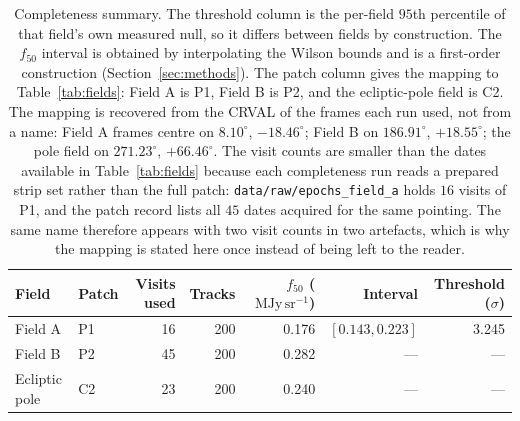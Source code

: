 \documentclass[11pt,a4paper]{article}
\newcommand{\mjysr}{\ \mathrm{MJy\,sr^{-1}}}
\newcommand{\code}[1]{\texttt{#1}}
\begin{document}
\begin{table}[htbp]
\centering
\small
\caption{Completeness summary. The threshold column is the per-field $95$th
percentile of that field's own measured null, so it differs between fields by
construction. The $f_{50}$ interval is obtained by interpolating the Wilson bounds
and is a first-order construction (Section~\ref{sec:methods}). The patch column
gives the mapping to Table~\ref{tab:fields}: Field A is P1, Field B is P2, and the
ecliptic-pole field is C2. The mapping is recovered from the CRVAL of the frames
each run used, not from a name: Field A frames centre on $8.10^{\circ}$,
$-18.46^{\circ}$; Field B on $186.91^{\circ}$, $+18.55^{\circ}$; the pole field on
$271.23^{\circ}$, $+66.46^{\circ}$. The visit counts are smaller than the dates available in
Table~\ref{tab:fields} because each completeness run reads a prepared strip set
rather than the full patch: \code{data/raw/epochs\_field\_a} holds $16$ visits of
P1, and the patch record lists all $45$ dates acquired for the same pointing. The
same name therefore appears with two visit counts in two artefacts, which is why
the mapping is stated here once instead of being left to the reader.}
\label{tab:completeness}
\begin{tabular}{llrrrrr}
\toprule
Field & Patch & Visits used & Tracks & $f_{50}$ ($\mjysr$) & Interval & Threshold ($\sigma$) \\
\midrule
Field A        & P1 & 16 & 200 & 0.176 & $[0.143, 0.223]$ & 3.245 \\
Field B        & P2 & 45 & 200 & 0.282 & ---              & ---   \\
Ecliptic pole  & C2 & 23 & 200 & 0.240 & ---              & ---   \\
\bottomrule
\end{tabular}
\end{table}
\end{document}
